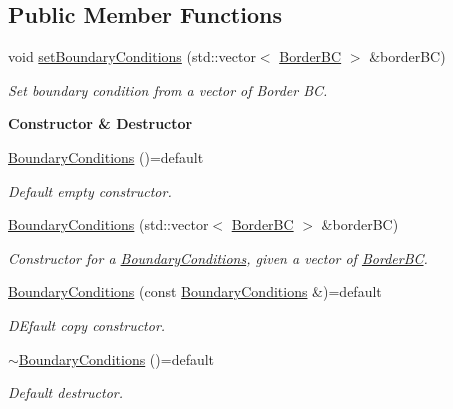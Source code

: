 \subsection*{Public Member Functions}
\begin{DoxyCompactItemize}
\item 
void \hyperlink{classFVCode3D_1_1BoundaryConditions_ae368974020ff21456d0fef9ef9d8006d}{set\+Boundary\+Conditions} (std\+::vector$<$ \hyperlink{classFVCode3D_1_1BoundaryConditions_1_1BorderBC}{Border\+BC} $>$ \&border\+BC)
\begin{DoxyCompactList}\small\item\em Set boundary condition from a vector of Border BC. \end{DoxyCompactList}\end{DoxyCompactItemize}
\begin{Indent}{\bf Constructor \& Destructor}\par
\begin{DoxyCompactItemize}
\item 
\hyperlink{classFVCode3D_1_1BoundaryConditions_ab66c0203b4153380363c581b674b32e1}{Boundary\+Conditions} ()=default
\begin{DoxyCompactList}\small\item\em Default empty constructor. \end{DoxyCompactList}\item 
\hyperlink{classFVCode3D_1_1BoundaryConditions_aeed054db17712ec0e34b1881fe2e559f}{Boundary\+Conditions} (std\+::vector$<$ \hyperlink{classFVCode3D_1_1BoundaryConditions_1_1BorderBC}{Border\+BC} $>$ \&border\+BC)
\begin{DoxyCompactList}\small\item\em Constructor for a \hyperlink{classFVCode3D_1_1BoundaryConditions}{Boundary\+Conditions}, given a vector of \hyperlink{classFVCode3D_1_1BoundaryConditions_1_1BorderBC}{Border\+BC}. \end{DoxyCompactList}\item 
\hyperlink{classFVCode3D_1_1BoundaryConditions_acf62b456137dbdc223c10d84d885f584}{Boundary\+Conditions} (const \hyperlink{classFVCode3D_1_1BoundaryConditions}{Boundary\+Conditions} \&)=default
\begin{DoxyCompactList}\small\item\em D\+Efault copy constructor. \end{DoxyCompactList}\item 
\hyperlink{classFVCode3D_1_1BoundaryConditions_a0c8497994d4badd8115163ee358ade96}{$\sim$\+Boundary\+Conditions} ()=default
\begin{DoxyCompactList}\small\item\em Default destructor. \end{DoxyCompactList}\end{DoxyCompactItemize}
\end{Indent}
